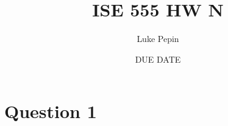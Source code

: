 \documentclass{article}
\title{ISE 555 HW N}
\author{Luke Pepin}
\date{DUE DATE}
\begin{document}
\maketitle

\section*{Question 1}
\end{document}
